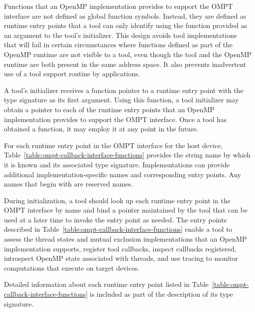 Functions that an OpenMP implementation provides to support the OMPT interface
are not defined as global function symbols. Instead, they are defined as runtime entry points
that a tool can only identify using the  function provided as an
argument to the tool's initializer. This design avoids tool
implementations that
will fail in certain circumstances where functions defined as part of
the OpenMP runtime are not visible to a tool, even though the tool and
the OpenMP runtime are both present in the same address space.
It also prevents inadvertent use of a tool support routine by
applications.

A tool's initializer receives a function pointer to a 
runtime entry point with the type signature
 as its first argument. Using this
function, a tool initializer may obtain a pointer to each of the
runtime entry points that an OpenMP implementation provides to support
the OMPT interface. Once a tool has obtained a
 function, it may employ it at any point in the future.

For each runtime entry point in the OMPT interface for the host device,
Table~\ref{table:ompt-callback-interface-functions} provides the string
name by which it is known and its associated type signature. Implementations
can provide additional implementation-specific names and corresponding
entry points.  Any names that begin with  are reserved names.

During initialization, a tool should look up each runtime entry point in the
OMPT interface by name and bind a pointer maintained by the tool
that can be used at a later time to invoke the entry point as needed. The entry points
described in Table~\ref{table:ompt-callback-interface-functions}
enable a tool to assess
the thread states and mutual exclusion implementations that an OpenMP
implementation supports,
register tool callbacks, inspect callbacks registered,
introspect OpenMP state associated with threads, and use tracing to monitor
computations that execute on target devices.

Detailed information about each runtime entry point listed in
Table~\ref{table:ompt-callback-interface-functions} is included as
part of the description of its type signature.

